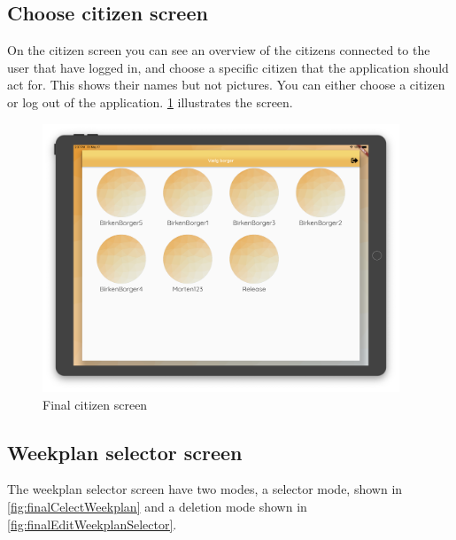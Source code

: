 \subsection{Choose citizen screen}
On the citizen screen you can see an overview of the citizens connected to the user that have logged in, and choose a specific citizen that the application should act for. This shows their names but not pictures. You can either choose a citizen or log out of the application. \ref{fig:finalCitizenScreen} illustrates the screen.
\begin{figure}[H]
    \begin{center}
        \includegraphics[width=0.95\textwidth]{figures/FinalScreen/chooseCitizenScreen.png}
    \end{center}
    \caption{Final citizen screen}
    \label{fig:finalCitizenScreen}
\end{figure}

\subsection{Weekplan selector screen}
The weekplan selector screen have two modes, a selector mode, shown in \ref{fig:finalCelectWeekplan} and a deletion mode shown in \ref{fig:finalEditWeekplanSelector}.

